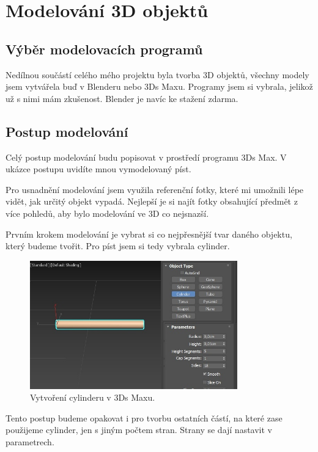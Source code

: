 \documentclass[12pt, a4paper,
twoside,        %
openright
]{report}
\begin{document}
	

\chapter {Modelování 3D objektů}



\section {Výběr modelovacích programů}
\label{vyber_modelovacich_programu}
Nedílnou součástí celého mého projektu byla tvorba 3D objektů, všechny modely jsem vytvářela buď v Blenderu nebo 3Ds Maxu. Programy jsem si vybrala, jelikož už s nimi mám zkušenost. Blender je navíc ke stažení zdarma. 

\section {Postup modelování}
Celý postup modelování budu popisovat v prostředí programu 3Ds Max. V ukázce postupu uvidíte mnou vymodelovaný píst.

Pro usnadnění modelování jsem využila referenční fotky, které mi umožnili lépe vidět, jak určitý objekt vypadá. Nejlepší je si najít fotky obsahující předmět z více pohledů, aby bylo modelování ve 3D co nejsnazší.  

Prvním krokem modelování je vybrat si co nejpřesnější tvar daného objektu, který budeme tvořit. Pro píst jsem si tedy vybrala cylinder.  

\begin{figure}[h!]
	\centering 
	\includegraphics[width=0.8\textwidth]{image/modelovani.jpg} 
	\caption{Vytvoření cylinderu v 3Ds Maxu.} 
	\label{fig:modelovani_cast1} 
\end{figure}



Tento postup budeme opakovat i pro tvorbu ostatních částí, na které zase použijeme cylinder, jen s jiným počtem stran. Strany se dají nastavit v parametrech. 
\end{document}
